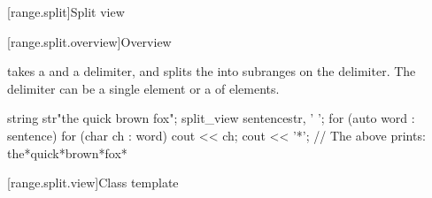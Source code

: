 [range.split]{Split view}

[range.split.overview]{Overview}

\pnum
{} takes a  and a delimiter, and splits
the  into subranges on the delimiter. The delimiter can be
a single element or a  of elements.

\pnum
\begin{example}
\begin{codeblock}
string str{"the quick brown fox"};
split_view sentence{str, ' '};
for (auto word : sentence) {
  for (char ch : word)
    cout << ch;
  cout << '*';
}
// The above prints: the*quick*brown*fox*
\end{codeblock}
\end{example}

[range.split.view]{Class template }

